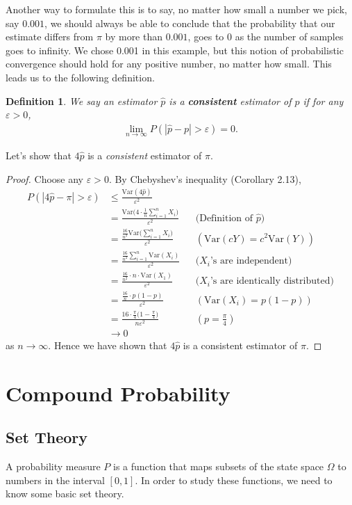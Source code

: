 \documentclass[11pt,letterpaper]{article}
\newcommand\eps{\varepsilon}
\newcommand\var{\text{Var}}
\numberwithin{theorem}{section}
\newtheorem{definition}[theorem]{Definition}
\numberwithin{definition}{section}
\numberwithin{lemma}{section}
\numberwithin{corollary}{section}
\numberwithin{proposition}{section}
\theoremstyle{definition}
\numberwithin{remark}{section}
\numberwithin{claim}{section}
\numberwithin{observation}{section}
\numberwithin{fact}{section}
\numberwithin{assumption}{section}
\numberwithin{example}{section}
\numberwithin{exercise}{section}
\begin{document}
Another way to formulate this is to say, no matter how small a number we pick, say $0.001$, we should always be able to conclude that the probability that our estimate differs from $\pi$ by more than $0.001$, goes to 0 as the number of samples goes to infinity. We chose 0.001 in this example, but this notion of probabilistic convergence should hold for any positive number, no matter how small. This leads us to the following definition.

\begin{definition}
We say an estimator $\hat{p}$ is a \textbf{consistent} estimator of $p$ if for any $\eps > 0$, 
\begin{align*}
\lim_{n \to \infty} P(|\hat{p}- p| > \eps) = 0.
\end{align*}
\end{definition}

Let's show that $4\hat{p}$ is a \textit{consistent} estimator of $\pi$.

\begin{proof}
Choose any $\eps > 0$. By Chebyshev's inequality (Corollary 2.13),
\begin{align*}
P(|4\hat{p} - \pi| > \eps) &\leq \frac{\var(4\hat{p})}{\eps^2} \\
&= \frac{\var\Big(4\cdot \frac{1}{n}\sum_{i=1}^n X_i\Big)}{\eps^2} &&\text{(Definition of }\hat{p}) \\
&= \frac{\frac{16}{n^2}\var\Big(\sum_{i=1}^n X_i\Big)}{\eps^2} && (\var(cY) = c^2\var(Y))\\
&= \frac{\frac{16}{n^2}\sum_{i=1}^n \var(X_i)}{\eps^2}&& \text{($X_i$'s are independent)}\\
&= \frac{\frac{16}{n^2}\cdot n \cdot \var(X_1)}{\eps^2}&& \text{($X_i$'s are identically distributed)}\\
&= \frac{\frac{16}{n} \cdot p(1-p)}{\eps^2}&& (\var(X_i) = p(1-p))\\
&= \frac{16 \cdot \frac{\pi}{4}\Big(1-\frac{\pi}{4}\Big)}{n\eps^2}&& (p = \frac{\pi}{4}) \\
&\to 0 
\end{align*}
as $n \to \infty$. Hence we have shown that $4\hat{p}$ is a consistent estimator of $\pi$.
\end{proof}

\newpage 
\section{Compound Probability}

\subsection{Set Theory}
A probability measure $P$ is a function that maps subsets of the state space $\Omega$ to numbers in the interval $[0,1]$. In order to study these functions, we need to know some basic set theory. 
\end{document}
